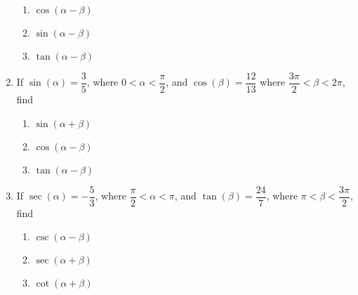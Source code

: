 \begin{enumerate}
\begin{multicols}{3}
\begin{enumerate}
\end{enumerate}

\end{multicols}

\begin{multicols}{3}

\begin{enumerate}

\setcounter{enumii}{\value{HWindent}}

\item  $\cos(\alpha - \beta)$
\item  $\sin(\alpha - \beta)$
\item  $\tan(\alpha - \beta)$

\end{enumerate}

\end{multicols}

\item If $\sin(\alpha) = \dfrac{3}{5}$, where $0 < \alpha < \dfrac{\pi}{2}$, and $\cos(\beta) = \dfrac{12}{13}$ where $\dfrac{3\pi}{2} < \beta < 2\pi$, find 

\begin{multicols}{3}

\begin{enumerate}

\item $\sin(\alpha + \beta)$
\item $\cos(\alpha - \beta)$
\item $\tan(\alpha - \beta)$

\end{enumerate}

\end{multicols}

\pagebreak

\item If $\sec(\alpha) = -\dfrac{5}{3}$, where $\dfrac{\pi}{2} < \alpha < \pi$, and $\tan(\beta) = \dfrac{24}{7}$, where $\pi < \beta < \dfrac{3\pi}{2}$, find

\begin{multicols}{3}

\begin{enumerate}

\item $\csc(\alpha - \beta)$
\item $\sec(\alpha + \beta)$
\item $\cot(\alpha + \beta)$

\end{enumerate}

\end{multicols}

\setcounter{HW}{\value{enumi}}

\end{enumerate}

